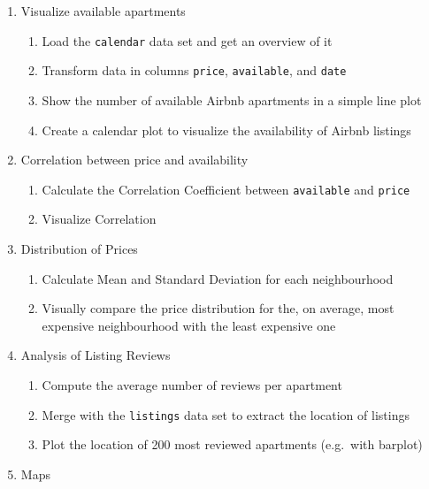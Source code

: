 \documentclass[
  11pt,
]{article}
\begin{document}
\begin{enumerate}
\def\labelenumi{\arabic{enumi}.}
\item
  Visualize available apartments

  \begin{enumerate}
  \def\labelenumii{\alph{enumii}.}
  \item
    Load the \texttt{calendar} data set and get an overview of it
  \item
    Transform data in columns \texttt{price}, \texttt{available}, and \texttt{date}
  \item
    Show the number of available Airbnb apartments in a simple line plot
  \item
    Create a calendar plot to visualize the availability of Airbnb listings
  \end{enumerate}
\item
  Correlation between price and availability

  \begin{enumerate}
  \def\labelenumii{\alph{enumii}.}
  \item
    Calculate the Correlation Coefficient between \texttt{available} and \texttt{price}
  \item
    Visualize Correlation
  \end{enumerate}
\item
  Distribution of Prices

  \begin{enumerate}
  \def\labelenumii{\alph{enumii}.}
  \item
    Calculate Mean and Standard Deviation for each neighbourhood
  \item
    Visually compare the price distribution for the, on average, most expensive neighbourhood with the least expensive one
  \end{enumerate}
\item
  Analysis of Listing Reviews

  \begin{enumerate}
  \def\labelenumii{\alph{enumii}.}
  \item
    Compute the average number of reviews per apartment
  \item
    Merge with the \texttt{listings} data set to extract the location of listings
  \item
    Plot the location of 200 most reviewed apartments (e.g.~with barplot)
  \end{enumerate}
\item
  Maps


\end{enumerate}
\end{document}
